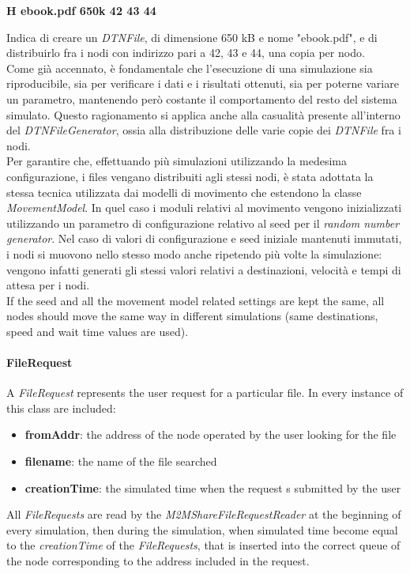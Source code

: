 \begin{center}
\textbf{H	ebook.pdf	650k	42	43	44}
\end{center}
Indica di creare un \textit{DTNFile}, di dimensione 650 kB e nome "ebook.pdf", e di distribuirlo fra i nodi con indirizzo pari a 42, 43 e 44, una copia per nodo.
\\

Come già  accennato, è fondamentale che l'esecuzione di una simulazione sia riproducibile, sia per verificare i dati e i risultati ottenuti, sia per poterne variare un parametro, mantenendo però costante il comportamento del resto del sistema simulato. Questo ragionamento si applica anche alla casualità  presente all'interno del \textit{DTNFileGenerator}, ossia alla distribuzione delle varie copie dei \textit{DTNFile} fra i nodi.
\\
Per garantire che, effettuando più simulazioni utilizzando la medesima configurazione, i files vengano distribuiti agli stessi nodi, è stata adottata la stessa tecnica utilizzata dai modelli di movimento che estendono la classe \textit{MovementModel}. In quel caso i moduli relativi al movimento vengono inizializzati utilizzando un parametro di configurazione relativo al seed per il \textit{random number generator}. Nel caso di valori di configurazione e seed iniziale mantenuti immutati, i nodi si muovono nello stesso modo anche ripetendo più volte la simulazione: vengono infatti generati gli stessi valori relativi a destinazioni, velocità  e tempi di attesa per i nodi.
\\
If the seed and all the movement model related settings are kept the same, all nodes should 
move the same way in different simulations (same destinations, speed and wait time values are used).


\paragraph{FileRequest}
A \textit{FileRequest} represents the user request for a particular file. In every instance of this class are included:
\begin{itemize}
\item \textbf{fromAddr}: the address of the node operated by the user looking for the file
\item \textbf{filename}: the name of the file searched
\item \textbf{creationTime}: the simulated time when the request s submitted by the user 
\end{itemize}
All \textit{FileRequests} are read by the \textit{M2MShareFileRequestReader} at the beginning of every simulation, then during the simulation, when simulated time become equal to the \textit{creationTime} of the \textit{FileRequests}, that is inserted into the correct queue of the node corresponding to the address included in the request.

